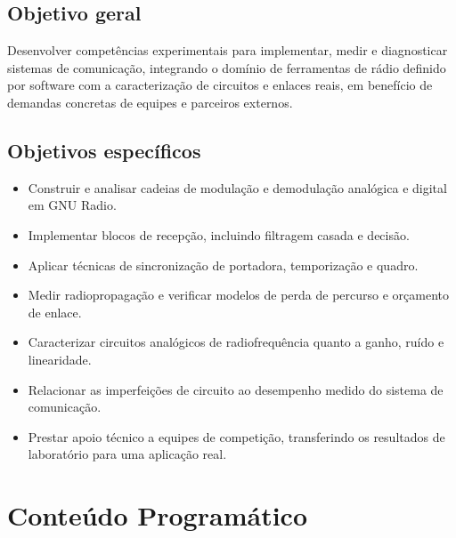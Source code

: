 \documentclass[11pt,a4paper]{article}
\begin{document}
\subsection*{Objetivo geral}

Desenvolver competências experimentais para implementar, medir e diagnosticar sistemas de comunicação, integrando o domínio de ferramentas de rádio definido por software com a caracterização de circuitos e enlaces reais, em benefício de demandas concretas de equipes e parceiros externos.

\subsection*{Objetivos específicos}

\begin{itemize}[noitemsep]
  \item Construir e analisar cadeias de modulação e demodulação analógica e digital em GNU Radio.
  \item Implementar blocos de recepção, incluindo filtragem casada e decisão.
  \item Aplicar técnicas de sincronização de portadora, temporização e quadro.
  \item Medir radiopropagação e verificar modelos de perda de percurso e orçamento de enlace.
  \item Caracterizar circuitos analógicos de radiofrequência quanto a ganho, ruído e linearidade.
  \item Relacionar as imperfeições de circuito ao desempenho medido do sistema de comunicação.
  \item Prestar apoio técnico a equipes de competição, transferindo os resultados de laboratório para uma aplicação real.
\end{itemize}

\section{Conteúdo Programático}
\end{document}
